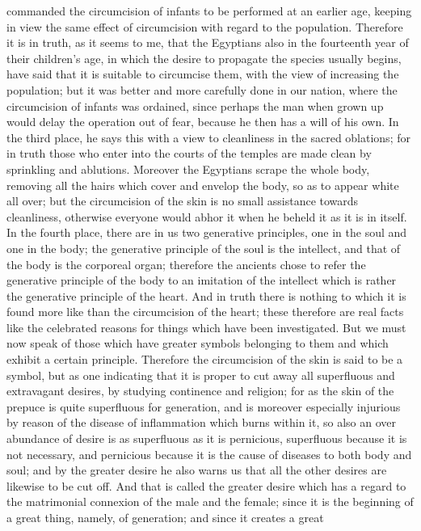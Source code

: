 commanded the circumcision of infants to be performed at an earlier age, keeping in view the
same effect of circumcision with regard to the population. Therefore it is in truth, as it seems to
me, that the Egyptians also in the fourteenth year of their children's age, in which the desire to
propagate the species usually begins, have said that it is suitable to circumcise them, with the view
of increasing the population; but it was better and more carefully done in our nation, where the
circumcision of infants was ordained, since perhaps the man when grown up would delay the
operation out of fear, because he then has a will of his own. In the third place, he says this with a
view to cleanliness in the sacred oblations; for in truth those who enter into the courts of the
temples are made clean by sprinkling and ablutions. Moreover the Egyptians scrape the whole
body, removing all the hairs which cover and envelop the body, so as to appear white all over; but
the circumcision of the skin is no small assistance towards cleanliness, otherwise everyone would
abhor it when he beheld it as it is in itself. In the fourth place, there are in us two generative
principles, one in the soul and one in the body; the generative principle of the soul is the intellect,
and that of the body is the corporeal organ; therefore the ancients chose to refer the generative
principle of the body to an imitation of the intellect which is rather the generative principle of the
heart. And in truth there is nothing to which it is found more like than the circumcision of the heart;
these therefore are real facts like the celebrated reasons for things which have been investigated.
But we must now speak of those which have greater symbols belonging to them and which exhibit a
certain principle. Therefore the circumcision of the skin is said to be a symbol, but as one
indicating that it is proper to cut away all superfluous and extravagant desires, by studying
continence and religion; for as the skin of the prepuce is quite superfluous for generation, and is
moreover especially injurious by reason of the disease of inflammation which burns within it, so
also an over abundance of desire is as superfluous as it is pernicious, superfluous because it is
not necessary, and pernicious because it is the cause of diseases to both body and soul; and by
the greater desire he also warns us that all the other desires are likewise to be cut off. And that is
called the greater desire which has a regard to the matrimonial connexion of the male and the
female; since it is the beginning of a great thing, namely, of generation; and since it creates a great
